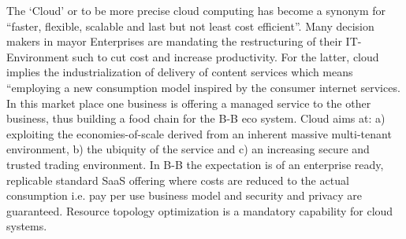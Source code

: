 
\ifCLASSINFOlangDE
{}
\fi

\begin{abstracts}        %
 The ‘Cloud’ or to be more precise cloud computing has become a synonym for “faster, flexible, scalable and last but not least cost efficient”. Many decision makers in mayor Enterprises are mandating the restructuring of their IT-Environment such to cut cost and increase productivity. For the latter, cloud implies the industrialization of delivery of content services which means “employing a new consumption model inspired by the consumer internet services. In this market place one business is offering a managed service to the other business, thus building a food chain for the B-B eco system. Cloud aims at: a) exploiting the economies-of-scale derived from an inherent massive multi-tenant environment, b) the ubiquity of the service and c) an increasing secure and trusted trading environment. In B-B the expectation is of an enterprise ready, replicable standard SaaS offering where costs are reduced to the actual consumption i.e. pay per use business model and security and privacy are guaranteed. Resource topology optimization is a mandatory capability for cloud systems. 

\end{abstracts}
\ifCLASSINFOlangDE
{}
\fi

